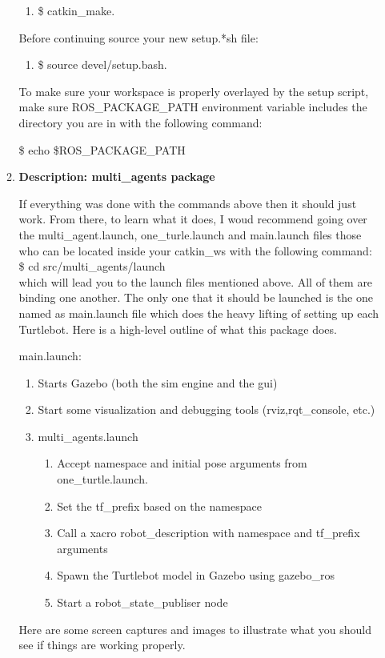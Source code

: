 \documentclass[journal]{IEEEtran}
\begin{document}
\begin{enumerate}
\begin{enumerate}
\begin{enumerate}
\item {{\$} catkin{\_}make}.
\end{enumerate}

Before continuing source your new setup.*sh file:
\begin{enumerate}
\item {{\$} source devel/setup.bash}.
\end{enumerate}

To make sure your workspace is properly overlayed by the setup script, make sure ROS{\_}PACKAGE{\_}PATH environment variable includes the directory you are in with the following command:

{\$} echo {\$}ROS{\_}PACKAGE{\_}PATH



\item \textbf {Description: multi{\_}agents package}


If everything was done with the commands above then it should just work. From there, to learn what it does, I woud recommend going over the multi{\_}agent.launch, one{\_}turle.launch and main.launch files those who can be located inside your catkin{\_}ws with the following command:\\
{\$} cd src/multi{\_}agents/launch \\
which will lead you to the launch files mentioned above. All of them are binding one another. The only one that it should be launched is the one named as main.launch file which does the heavy lifting of setting up each Turtlebot. Here is a high-level outline of what this package does.

main.launch:
\begin{enumerate}
\item {Starts Gazebo (both the sim engine and the gui)}
\item {Start some visualization and debugging tools (rviz,rqt{\_}console, etc.)}
\item {multi{\_}agents.launch}

\begin{enumerate}
\item {Accept namespace and initial pose arguments from one{\_}turtle.launch}.
\item {Set the tf{\_}prefix based on the namespace}
\item {Call a xacro robot{\_}description with namespace and tf{\_}prefix arguments}
\item {Spawn the Turtlebot model in Gazebo using gazebo{\_}ros}
\item {Start a robot{\_}state{\_}publiser node}
\end{enumerate}
\end{enumerate}
Here are some screen captures and images to illustrate what you should see if things are working properly.
    

\end{enumerate}
\end{enumerate}
\end{document}
